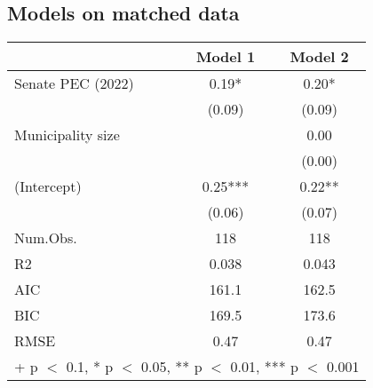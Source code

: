 \documentclass[fignum,12pt,titlepage]{article}
\begin{document}
\subsection{Models on matched data \label{tab:5}}
\begin{tabular}[H]{lcc}
\toprule
  & Model 1 & Model 2\\
\midrule
Senate PEC (2022) & \num{0.19}* & \num{0.20}*\\
 & (\num{0.09}) & (\num{0.09})\\
Municipality size &  & \num{0.00}\\
 &  & (\num{0.00})\\
(Intercept) & \num{0.25}*** & \num{0.22}**\\
 & (\num{0.06}) & (\num{0.07})\\
\midrule
Num.Obs. & \num{118} & \num{118}\\
R2 & \num{0.038} & \num{0.043}\\
AIC & \num{161.1} & \num{162.5}\\
BIC & \num{169.5} & \num{173.6}\\
RMSE & \num{0.47} & \num{0.47}\\
\bottomrule
\multicolumn{3}{l}{\rule{0pt}{1em}+ p $<$ 0.1, * p $<$ 0.05, ** p $<$ 0.01, *** p $<$ 0.001}\\
\end{tabular}
\end{document}
